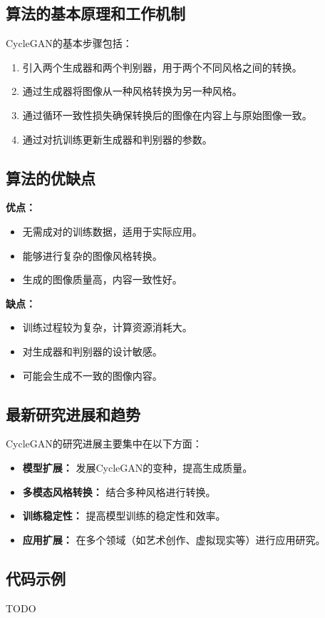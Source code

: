 \subsection*{算法的基本原理和工作机制}
CycleGAN的基本步骤包括：
\begin{enumerate}
    \item 引入两个生成器和两个判别器，用于两个不同风格之间的转换。
    \item 通过生成器将图像从一种风格转换为另一种风格。
    \item 通过循环一致性损失确保转换后的图像在内容上与原始图像一致。
    \item 通过对抗训练更新生成器和判别器的参数。
\end{enumerate}

\subsection*{算法的优缺点}
\textbf{优点：}
\begin{itemize}
    \item 无需成对的训练数据，适用于实际应用。
    \item 能够进行复杂的图像风格转换。
    \item 生成的图像质量高，内容一致性好。
\end{itemize}

\textbf{缺点：}
\begin{itemize}
    \item 训练过程较为复杂，计算资源消耗大。
    \item 对生成器和判别器的设计敏感。
    \item 可能会生成不一致的图像内容。
\end{itemize}

\subsection*{最新研究进展和趋势}
CycleGAN的研究进展主要集中在以下方面：
\begin{itemize}
    \item \textbf{模型扩展：} 发展CycleGAN的变种，提高生成质量。
    \item \textbf{多模态风格转换：} 结合多种风格进行转换。
    \item \textbf{训练稳定性：} 提高模型训练的稳定性和效率。
    \item \textbf{应用扩展：} 在多个领域（如艺术创作、虚拟现实等）进行应用研究。
\end{itemize}
\subsection*{代码示例}
TODO
\begin{lstlisting}

\end{lstlisting}


